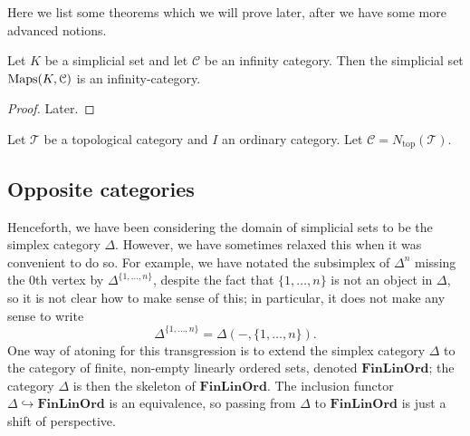 \documentclass[main.tex]{subfiles}
\begin{document}
Here we list some theorems which we will prove later, after we have some more advanced notions.

\begin{proposition}
  Let $K$ be a simplicial set and let $\mathcal{C}$ be an infinity category. Then the simplicial set $\operatorname{Maps}(K, \mathcal{C})$ is an infinity-category.
\end{proposition}
\begin{proof}
  Later.
\end{proof}

\begin{definition}
  \label{def:homotopy_coherent_diagram}
  Let $\mathcal{T}$ be a topological category and $I$ an ordinary category. Let $\mathcal{C} = N_{\mathrm{top}}(\mathcal{T})$.
\end{definition}


\subsection{Opposite categories}
\label{ssc:opposite_categories}

Henceforth, we have been considering the domain of simplicial sets to be the simplex category $\Delta$. However, we have sometimes relaxed this when it was convenient to do so. For example, we have notated the subsimplex of $\Delta^{n}$ missing the 0th vertex by $\Delta^{\{1, \ldots, n\}}$, despite the fact that $\{1, \ldots, n\}$ is not an object in $\Delta$, so it is not clear how to make sense of this; in particular, it does not make any sense to write
\begin{equation*}
  \Delta^{\{1, \ldots, n\}} = \Delta(-, \{1, \ldots, n\}).
\end{equation*}
One way of atoning for this transgression is to extend the simplex category $\Delta$ to the category of finite, non-empty linearly ordered sets, denoted $\mathbf{FinLinOrd}$; the category $\Delta$ is then the skeleton of $\mathbf{FinLinOrd}$. The inclusion functor $\Delta \hookrightarrow \mathbf{FinLinOrd}$ is an equivalence, so passing from $\Delta$ to $\mathbf{FinLinOrd}$ is just a shift of perspective.
\end{document}

